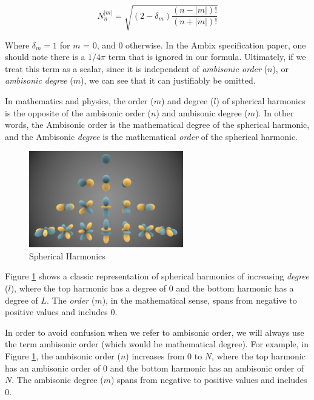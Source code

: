 \begin{equation}
N_{n}^{|m|}=\sqrt{\left(2-\delta_{m}\right) \frac{(n-|m|) !}{(n+|m|) !}}
\end{equation}

Where $\delta_m = 1$ for $m$ = 0, and 0 otherwise. In the Ambix specification paper, one should note there is a $1/4\pi$ term that is ignored in our formula. Ultimately, if we treat this term as a scalar, since it is independent of \textit{ambisonic order} ($n$), or \textit{ambisonic degree} ($m$), we can see that it can justifiably be omitted. 

In mathematics and physics, the order ($m$) and degree ($l$) of spherical harmonics is the opposite of the ambisonic order ($n$) and ambisonic degree ($m$). In other words, the Ambisonic order is the mathematical degree of the spherical harmonic, and the Ambisonic \textit{degree} is the mathematical \textit{order} of the spherical harmonic. 


\begin{figure}[ht!]%
\centering
\includegraphics[width=0.6\textwidth]{img/sph-harm.png}
\caption{Spherical Harmonics \cite{Spherica39online}}
\label{fig:sph-harm}
\end{figure}

Figure \ref{fig:sph-harm} shows a classic representation of spherical harmonics of increasing \textit{degree} ($l$), where the top harmonic has a degree of 0 and the bottom harmonic has a degree of $L$. The \textit{order} ($m$), in the mathematical sense, spans from negative to positive values and includes 0. 

In order to avoid confusion when we refer to ambisonic order, we will always use the term ambisonic order (which would be mathematical degree). For example, in Figure \ref{fig:sph-harm}, the ambisonic order ($n$) increases from 0 to $N$, where the top harmonic has an ambisonic order of 0 and the bottom harmonic has an ambisonic order of $N$. The ambisonic degree ($m$) spans from negative to positive values and includes 0. 


